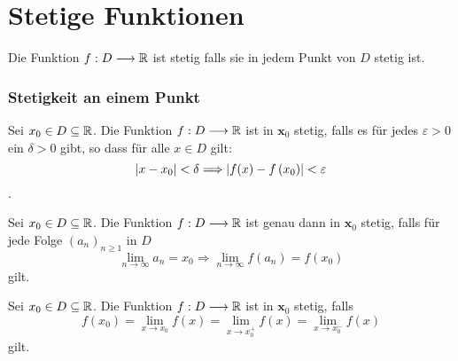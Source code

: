 \part{Stetige Funktionen}

\Def Die Funktion $f: D \longrightarrow \mathbb{R}$ ist stetig falls sie in jedem Punkt von $D$ stetig ist.

\section{Stetigkeit an einem Punkt}

\Def[Epsilon] Sei $x_{0} \in D \subseteq \mathbb{R}$. Die Funktion $f: D \longrightarrow \mathbb{R}$ ist in $\boldsymbol{x}_{0}$ stetig, falls es für jedes $\varepsilon>0$ ein $\delta>0$ gibt, so dass für alle $x \in D$ gilt: $$\left\lvert x-x_{0} \right\rvert<\delta \Longrightarrow\left\lvert f(x)-f\left(x_{0}\right) \right\rvert<\varepsilon$$.

\Satz[Sequence] Sei $x_{0} \in D \subseteq \mathbb{R}$. Die Funktion $f: D \longrightarrow \mathbb{R}$ ist genau dann in $\boldsymbol{x}_{0}$ stetig, falls für jede Folge $\left(a_{n}\right)_{n \geqslant 1}$ in $D$
	$$\lim \limits_{n \rightarrow \infty} a_{n}=x_{0} \Longrightarrow \lim \limits_{n \rightarrow \infty} f\left(a_{n}\right)=f\left(x_{0}\right)$$ gilt.
	
\Satz[Sidewise] Sei $x_{0} \in D \subseteq \mathbb{R}$. Die Funktion $f: D \longrightarrow \mathbb{R}$ ist in $\boldsymbol{x}_{0}$ stetig, falls 
	$$f(x_0) =\lim \limits_{x \rightarrow x_0} f(x) =  \lim \limits_{x \rightarrow x_0^+} f(x) = \lim \limits_{x \rightarrow x_0^-} f(x)$$ gilt.	



